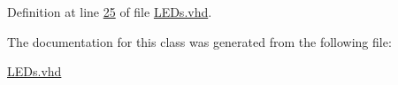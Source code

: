 Definition at line \hyperlink{_l_e_ds_8vhd_source_l00025}{25} of file \hyperlink{_l_e_ds_8vhd_source}{L\+E\+Ds.\+vhd}.



The documentation for this class was generated from the following file\+:\begin{DoxyCompactItemize}
\item 
\hyperlink{_l_e_ds_8vhd}{L\+E\+Ds.\+vhd}\end{DoxyCompactItemize}
